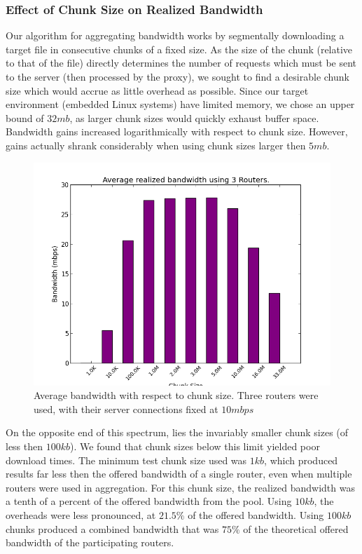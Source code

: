 \documentclass[12pt]{article}
\begin{document}
	\subsubsection{Effect of Chunk Size on Realized Bandwidth}

		Our algorithm for aggregating bandwidth works by segmentally downloading a target file in consecutive chunks of a fixed size. As the size of the chunk (relative to that of the file) directly determines the number of requests which must be sent to the server (then processed by the proxy), we sought to find a desirable chunk size which would accrue as little overhead as possible. Since our target environment (embedded Linux systems) have limited memory, we chose an upper bound of $32 mb$, as larger chunk sizes would quickly exhaust buffer space. Bandwidth gains increased logarithmically with respect to chunk size. However, gains actually shrank considerably when using chunk sizes larger then $5 mb$. 
		
		\begin{figure}[H]
			\centering
			\includegraphics[keepaspectratio=true,scale=0.5]{all_sizes.png}
			\caption{Average bandwidth with respect to chunk size. Three routers were used, with their server connections fixed at $10 mbps$}
		\end{figure}

		On the opposite end of this spectrum, lies the invariably smaller chunk sizes (of less then $100 kb$). We found that chunk sizes below this limit yielded poor download times. The minimum test chunk size used was $1 kb$, which produced results far less then the offered bandwidth of a single router, even when multiple routers were used in aggregation. For this chunk size, the realized bandwidth was a tenth of a percent of the offered bandwidth from the pool. Using $10 kb$, the overheads were less pronounced, at $21.5\%$ of the offered bandwidth. Using $100 kb$ chunks produced a combined bandwidth that was $75\%$ of the theoretical offered bandwidth of the participating routers.
\end{document}
